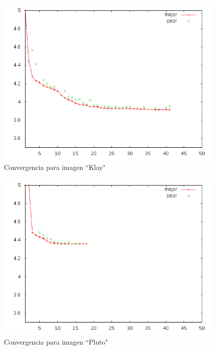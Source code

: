 \begin{figure}[h]
    \includegraphics[width=1.0\textwidth]{plot_klay}
    \caption{Convergencia para imagen ``Klay"}
    \label{img:plot-klay}
\end{figure}

\begin{figure}[h]
    \includegraphics[width=1.0\textwidth]{plot_pluto}
    \caption{Convergencia para imagen ``Pluto"}
    \label{img:plot-pluto}
\end{figure}

